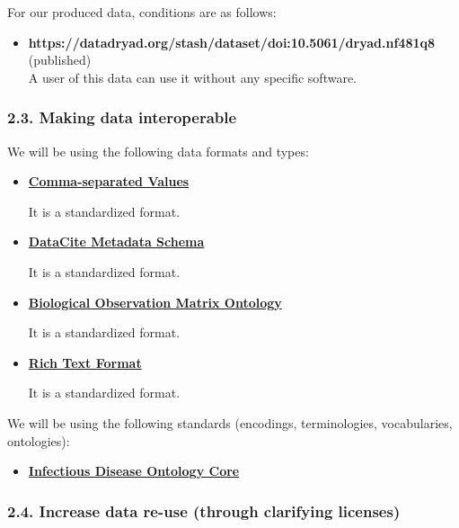 \documentclass[
  english,
]{article}
\providecommand{\tightlist}{%
  \setlength{\itemsep}{0pt}\setlength{\parskip}{0pt}}
\begin{document}
For our produced data, conditions are as follows:

\begin{itemize}
\tightlist
\item
  \textbf{https://datadryad.org/stash/dataset/doi:10.5061/dryad.nf481q8}
  (published)\\
  A user of this data can use it without any specific software.
\end{itemize}

\hypertarget{making-data-interoperable}{%
\subsubsection{2.3. Making data
interoperable}\label{making-data-interoperable}}

\hypertarget{q-interoperable}{}
We will be using the following data formats and types:

\begin{itemize}
\item
  \textbf{\href{https://fairsharing.org/bsg-s001546}{Comma-separated
  Values}}

  It is a standardized format.
\item
  \textbf{\href{https://fairsharing.org/bsg-s000588}{DataCite Metadata
  Schema}}

  It is a standardized format.
\item
  \textbf{\href{https://fairsharing.org/bsg-s000884}{Biological
  Observation Matrix Ontology}}

  It is a standardized format.
\item
  \textbf{\href{https://fairsharing.org/bsg-s001263}{Rich Text Format}}

  It is a standardized format.
\end{itemize}

We will be using the following standards (encodings, terminologies,
vocabularies, ontologies):

\begin{itemize}
\tightlist
\item
  \textbf{\href{https://fairsharing.org/bsg-s000095}{Infectious Disease
  Ontology Core}}
\end{itemize}

\hypertarget{increase-data-re-use-through-clarifying-licenses}{%
\subsubsection{2.4. Increase data re-use (through clarifying
licenses)}\label{increase-data-re-use-through-clarifying-licenses}}
\end{document}

